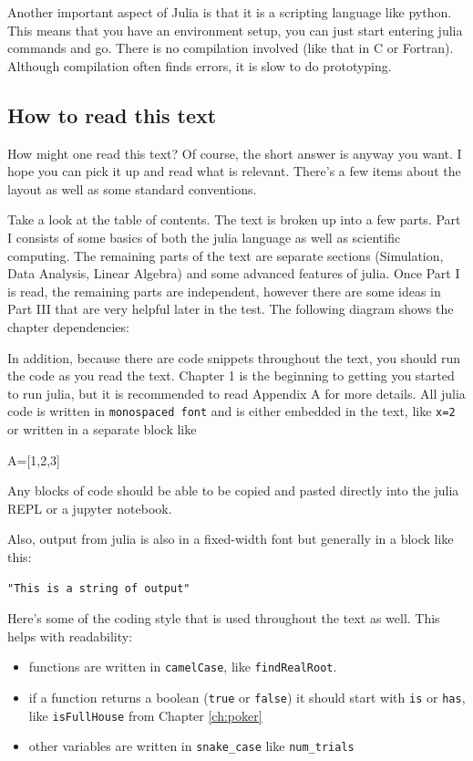 Another important aspect of Julia is that it is a scripting language like python.  This means that you have an environment setup, you can just start entering julia commands and go.  There is no compilation involved (like that in C or Fortran).  Although compilation often finds errors, it is slow to do prototyping. 

\subsection*{How to read this text}

How might one read this text?  Of course, the short answer is anyway you want.  I hope you can pick it up and read what is relevant.  There's a few items about the layout as well as some standard conventions. 

Take a look at the table of contents.  The text is broken up into a few parts.  Part I consists of some basics of both the julia language as well as scientific computing.  The remaining parts of the text are separate sections (Simulation, Data Analysis, Linear Algebra) and some advanced features of julia.  Once Part I is read, the remaining parts are independent, however there are some ideas in Part III that are very helpful later in the test.  The following diagram shows the chapter dependencies:


In addition, because there are code snippets throughout the text, you should run the code as you read the text.  Chapter 1 is the beginning to getting you started to run julia, but it is recommended to read Appendix A for more details.  All julia code is written in \texttt{monospaced font} and is either embedded in the text, like \verb|x=2| or written in a separate block like
\begin{jlverbatim}
A=[1,2,3]
\end{jlverbatim}

Any blocks of code should be able to be copied and pasted directly into the julia REPL or a jupyter notebook. 

Also, output from julia is also in a fixed-width font but generally in a block like this:
%
\begin{verbatim}
"This is a string of output"
\end{verbatim}

Here's some of the coding style that is used throughout the text as well.  This helps with readability:
\begin{itemize}
\item functions are written in \verb!camelCase!, like \verb!findRealRoot!.
\item if a function returns a boolean (\verb!true! or \verb!false!) it should start with \verb!is! or \verb!has!, like \verb!isFullHouse! from Chapter \ref{ch:poker}
\item other variables are written in \verb!snake_case! like \verb!num_trials!
\end{itemize}



